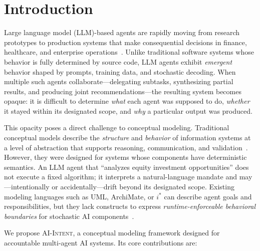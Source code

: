 \documentclass[runningheads]{llncs}
\begin{document}
\section{Introduction}
\label{sec:introduction}

Large language model (LLM)-based agents are rapidly moving from research prototypes to production systems that make consequential decisions in finance, healthcare, and enterprise operations~\cite{wang2024survey,xi2023rise}. Unlike traditional software systems whose behavior is fully determined by source code, LLM agents exhibit \emph{emergent} behavior shaped by prompts, training data, and stochastic decoding. When multiple such agents collaborate---delegating subtasks, synthesizing partial results, and producing joint recommendations---the resulting system becomes opaque: it is difficult to determine \emph{what} each agent was supposed to do, \emph{whether} it stayed within its designated scope, and \emph{why} a particular output was produced.

This opacity poses a direct challenge to conceptual modeling. Traditional conceptual models describe the \emph{structure} and \emph{behavior} of information systems at a level of abstraction that supports reasoning, communication, and validation~\cite{mylopoulos1992conceptual,olivePMD07}. However, they were designed for systems whose components have deterministic semantics. An LLM agent that ``analyzes equity investment opportunities'' does not execute a fixed algorithm; it interprets a natural-language mandate and may---intentionally or accidentally---drift beyond its designated scope. Existing modeling languages such as UML, ArchiMate, or $i^*$ can describe agent goals and responsibilities, but they lack constructs to express \emph{runtime-enforceable behavioral boundaries} for stochastic AI components~\cite{yu2011social}.

We propose \textsc{AI-Intent}, a conceptual modeling framework designed for accountable multi-agent AI systems. Its core contributions are:
\end{document}
